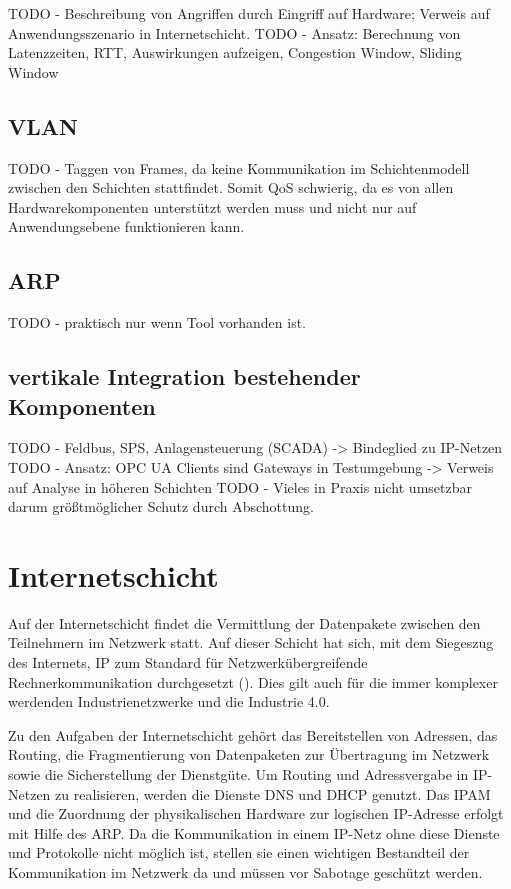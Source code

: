 TODO - Beschreibung von Angriffen durch Eingriff auf Hardware; Verweis auf Anwendungsszenario in Internetschicht.
TODO - Ansatz: Berechnung von Latenzzeiten, RTT, Auswirkungen aufzeigen, Congestion Window, Sliding Window

\subsection{\ac{VLAN}}
\label{Analyse:VLAN}
TODO - Taggen von Frames, da keine Kommunikation im Schichtenmodell zwischen den Schichten stattfindet. Somit QoS schwierig, da es von allen Hardwarekomponenten unterstützt werden muss und nicht nur auf Anwendungsebene funktionieren kann.

\subsection{ARP}
TODO - praktisch nur wenn Tool vorhanden ist.

\subsection{vertikale Integration bestehender Komponenten}
TODO - Feldbus, SPS, Anlagensteuerung (SCADA) -> Bindeglied zu IP-Netzen
TODO - Ansatz: OPC UA Clients sind Gateways in Testumgebung -> Verweis auf Analyse in höheren Schichten
TODO - Vieles in Praxis nicht umsetzbar darum größtmöglicher Schutz durch Abschottung.

\section{Internetschicht}
Auf der Internetschicht findet die Vermittlung der Datenpakete zwischen den Teilnehmern im Netzwerk statt. Auf dieser Schicht hat sich, mit dem Siegeszug des Internets, \ac{IP} zum Standard für Netzwerkübergreifende Rechnerkommunikation durchgesetzt (\cite{meinel2011}). Dies gilt auch für die immer komplexer werdenden Industrienetzwerke und die Industrie 4.0.

Zu den Aufgaben der Internetschicht gehört das Bereitstellen von Adressen, das Routing, die Fragmentierung von Datenpaketen zur Übertragung im Netzwerk sowie die Sicherstellung der Dienstgüte. Um Routing und Adressvergabe in \ac{IP}-Netzen zu realisieren, werden die Dienste \ac{DNS} und \ac{DHCP} genutzt. Das \ac{IPAM} und die Zuordnung der physikalischen Hardware zur logischen \ac{IP}-Adresse erfolgt mit Hilfe des \ac{ARP}. Da die Kommunikation in einem \ac{IP}-Netz ohne diese Dienste und Protokolle nicht möglich ist, stellen sie einen wichtigen Bestandteil der Kommunikation im Netzwerk da und müssen vor Sabotage geschützt werden.

